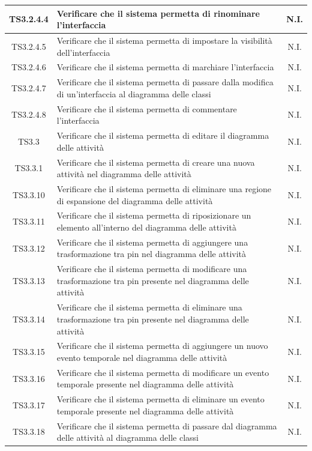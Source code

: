 \documentclass[../PianoDiQualifica.tex]{subfiles}
\begin{document}
\begin{longtable}{|c|>{\centering}p{10cm}|c|}
	\hline
	TS3.2.4.4 & Verificare che il sistema permetta di rinominare l'interfaccia & N.I. \\
	\hline
	TS3.2.4.5 & Verificare che il sistema permetta di impostare la visibilità dell'interfaccia & N.I. \\
	\hline
	TS3.2.4.6 & Verificare che il sistema permetta di marchiare l'interfaccia & N.I. \\
	\hline
	TS3.2.4.7 & Verificare che il sistema permetta di passare dalla modifica di un'interfaccia al diagramma delle classi & N.I. \\
	\hline
	TS3.2.4.8 & Verificare che il sistema permetta di commentare l'interfaccia & N.I. \\
	\hline
	TS3.3 & Verificare che il sistema permetta di editare il diagramma delle attività & N.I. \\
	\hline
	TS3.3.1 & Verificare che il sistema permetta di creare una nuova attività nel diagramma delle attività & N.I. \\
	\hline
	TS3.3.10 & Verificare che il sistema permetta di eliminare una regione di espansione del diagramma delle attività & N.I. \\
	\hline
	TS3.3.11 & Verificare che il sistema permetta di riposizionare un elemento all'interno del diagramma delle attività & N.I. \\
	\hline
	TS3.3.12 & Verificare che il sistema permetta di aggiungere una trasformazione tra pin nel diagramma delle attività & N.I. \\
	\hline
	TS3.3.13 & Verificare che il sistema permetta di modificare una trasformazione tra pin presente nel diagramma delle attività & N.I. \\
	\hline
	TS3.3.14 & Verificare che il sistema permetta di eliminare una trasformazione tra pin presente nel diagramma delle attività & N.I. \\
	\hline
	TS3.3.15 & Verificare che il sistema permetta di aggiungere un nuovo evento temporale nel diagramma delle attività & N.I. \\
	\hline
	TS3.3.16 & Verificare che il sistema permetta di modificare un evento temporale presente nel diagramma delle attività & N.I. \\
	\hline
	TS3.3.17 & Verificare che il sistema permetta di eliminare un evento temporale presente nel diagramma delle attività & N.I. \\
	\hline
	TS3.3.18 & Verificare che il sistema permetta di passare dal diagramma delle attività al diagramma delle classi & N.I. \\

\end{longtable}
\end{document}
